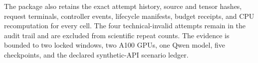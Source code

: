 The package also retains the exact attempt history, source and tensor hashes,
request terminals, controller events, lifecycle manifests, budget receipts, and
CPU recomputation for every cell. The four technical-invalid attempts remain in
the audit trail and are excluded from scientific repeat counts. The evidence is
bounded to two locked windows, two A100 GPUs, one Qwen model, five checkpoints,
and the declared synthetic-API scenario ledger.

